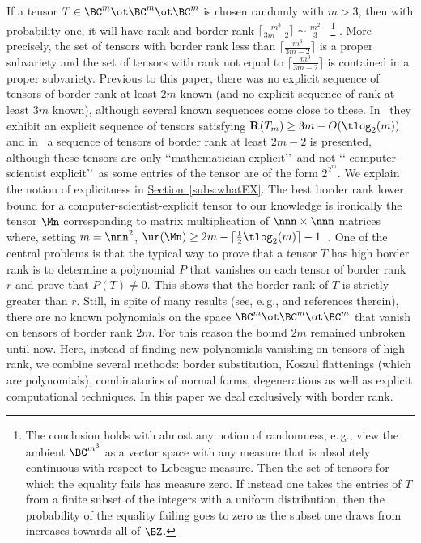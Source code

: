\documentclass[11pt]{article}
\newcommand{\expref}[2]{\texorpdfstring{\hyperref[#2]{#1~\ref{#2}}}{#1~\ref{#2}}}
\newcommand{\eg}{e.\,g.}
\begin{document}
If a tensor  $T\in \BC^m\ot \BC^m\ot \BC^m$ is chosen randomly with $m>3$, then with probability
one, it will have  rank and border rank $\lceil \frac{m^3}{3m-2}\rceil\sim \frac{m^2}3$~\cite{MR87f:15017} 
\footnote{The conclusion holds with almost any notion of %
randomness,  %
\eg, view the ambient $\BC^{m^3}$ as a vector space
with any measure that is absolutely continuous with respect to Lebesgue measure. Then the set of tensors for which the equality fails has measure zero.
If instead one takes the entries of $T$ from a finite subset of the integers with a uniform distribution, then the probability of
the equality failing goes to zero as the subset one draws from increases towards all of $\BZ$.}
.
 More precisely, the
set  of tensors with    border rank less than $\lceil \frac{m^3}{3m-2}\rceil$ is a proper subvariety and the
set of tensors with rank  not equal to  $\lceil \frac{m^3}{3m-2}\rceil$ is contained in a proper subvariety. 
Previous to this paper, there was no explicit sequence of tensors of
 border rank at least $2m$ known (and no explicit
sequence of
rank at least $3m$ known), although several known sequences come close to these.
In~\cite{MR3025382} they exhibit an explicit sequence of tensors satisfying
$\mathbf R(T_m)\geq 3m-O(\tlog_2(m))$
and in~\cite{MR3320240} a sequence of tensors of border rank at least $2m-2$ is presented,
although these tensors are only \lq\lq mathematician explicit\rq\rq\ and not
\lq\lq %
computer-scientist  %
explicit\rq\rq\ 
as some entries of the tensor are of the form $2^{2^m}$. We explain  the notion of
%
explicitness %
%
in \expref{Section}{subs:whatEX}.  %
The best border rank lower bound for
a %
%
computer-scientist-explicit  %
tensor to our knowledge is ironically the tensor $\Mn$ corresponding 
to matrix multiplication of $\nnn\times \nnn$
matrices where, setting $m=\nnn^2$,  $\ur(\Mn)\geq 2m-\lceil\frac 12 \tlog_2(m)\rceil-1$~\cite{MR3842382}. One of the central problems is that the typical way to prove that a tensor $T$ has high border rank is to determine a polynomial $P$ that vanishes on each tensor of border rank $r$ and prove that $P(T)\neq 0$. This shows that the border rank of $T$ is strictly greater than $r$. Still, in spite of many results  (see, \eg,  \cite{GO60survey} and references therein), there are no known polynomials on the space $\BC^m\ot \BC^m\ot \BC^m$ that vanish on tensors of border rank $2m$. For this reason the bound $2m$ remained unbroken until now. Here, instead of finding new polynomials vanishing on tensors of high rank, we combine several  methods: border substitution, Koszul flattenings
(which are polynomials),  combinatorics of normal forms, degenerations as well as explicit computational techniques. In this paper
we deal exclusively with border rank.
\end{document}
